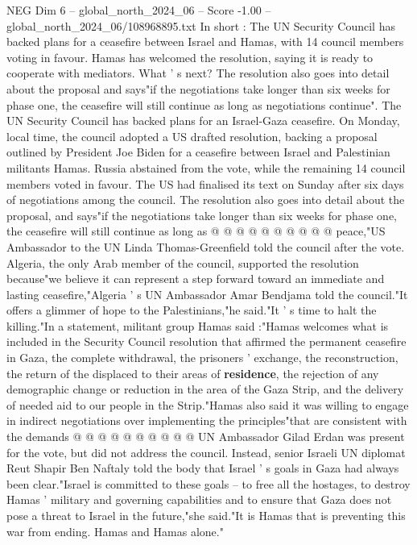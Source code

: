 \begin{textsample}{NEG Dim 6 – global\_north\_2024\_06 – Score -1.00 – global\_north\_2024\_06/108968895.txt}  \label{ex:f6_neg_313}
In short : The UN Security Council has backed plans for a ceasefire between Israel and Hamas, with 14 council members voting in favour.
Hamas has welcomed the resolution, saying it is ready to cooperate with mediators.
What ' s next?
The resolution also goes into detail about the proposal and says"if the negotiations take longer than six weeks for phase one, the ceasefire will still continue as long as negotiations continue".
The UN Security Council has backed plans for an Israel-Gaza ceasefire.
On Monday, local time, the council adopted a US drafted resolution, backing a proposal outlined by President Joe Biden for a ceasefire between Israel and Palestinian militants Hamas.
Russia abstained from the vote, while the remaining 14 council members voted in favour.
The US had finalised its text on Sunday after six days of negotiations among the council.
The resolution also goes into detail about the proposal, and says"if the negotiations take longer than six weeks for phase one, the ceasefire will still continue as long as @ @ @ @ @ @ @ @ @ @ peace,"US Ambassador to the UN Linda Thomas-Greenfield told the council after the vote.
Algeria, the only Arab member of the council, supported the resolution because"we believe it can represent a step forward toward an immediate and lasting ceasefire,"Algeria ' s UN Ambassador Amar Bendjama told the council."It offers a glimmer of hope to the Palestinians,"he said."It ' s time to halt the killing."In a statement, militant group Hamas said :"Hamas welcomes what is included in the Security Council resolution that affirmed the permanent ceasefire in Gaza, the complete withdrawal, the prisoners ' exchange, the reconstruction, the return of the displaced to their areas of \textbf{residence}, the rejection of any demographic change or reduction in the area of the Gaza Strip, and the delivery of needed aid to our people in the Strip."Hamas also said it was willing to engage in indirect negotiations over implementing the principles"that are consistent with the demands @ @ @ @ @ @ @ @ @ @ UN Ambassador Gilad Erdan was present for the vote, but did not address the council.
Instead, senior Israeli UN diplomat Reut Shapir Ben Naftaly told the body that Israel ' s goals in Gaza had always been clear."Israel is committed to these goals -- to free all the hostages, to destroy Hamas ' military and governing capabilities and to ensure that Gaza does not pose a threat to Israel in the future,"she said."It is Hamas that is preventing this war from ending.
Hamas and Hamas alone."

\end{textsample}
